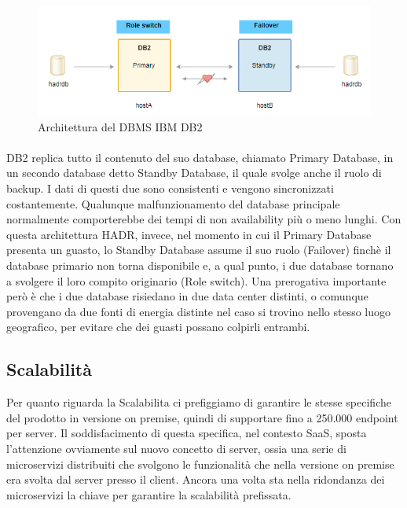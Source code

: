 \begin{figure}[h!]
	\centering
	\includegraphics[width=\textwidth,keepaspectratio=true]{capitoli/imgs/db2.PNG}
	\caption{Architettura del DBMS IBM DB2}
\end{figure}

\paragraph{}
DB2 replica tutto il contenuto del suo database, chiamato Primary Database, in un secondo database detto Standby Database, il quale svolge anche il ruolo di backup. I dati di questi due sono consistenti e vengono sincronizzati costantemente. Qualunque malfunzionamento del database principale normalmente comporterebbe dei tempi di non availability più o meno lunghi. Con questa architettura HADR, invece, nel momento in cui il Primary Database presenta un guasto, lo Standby Database assume il suo ruolo (Failover) finchè il database primario non torna disponibile e, a qual punto, i due database tornano a svolgere il loro compito originario (Role switch). Una prerogativa importante però è che i due database risiedano in due data center distinti, o comunque provengano da due fonti di energia distinte nel caso si trovino nello stesso luogo geografico, per evitare che dei guasti possano colpirli entrambi. 

\subsection{Scalabilità}
Per quanto riguarda la Scalabilita ci prefiggiamo di garantire le stesse specifiche del prodotto in versione on premise, quindi di supportare fino a 250.000 endpoint per server. Il soddisfacimento di questa specifica, nel contesto SaaS, sposta l'attenzione ovviamente sul nuovo concetto di server, ossia una serie di microservizi distribuiti che svolgono le funzionalità che nella versione on premise era svolta dal server presso il client. Ancora una volta sta nella ridondanza dei microservizi la chiave per garantire la scalabilità prefissata.

